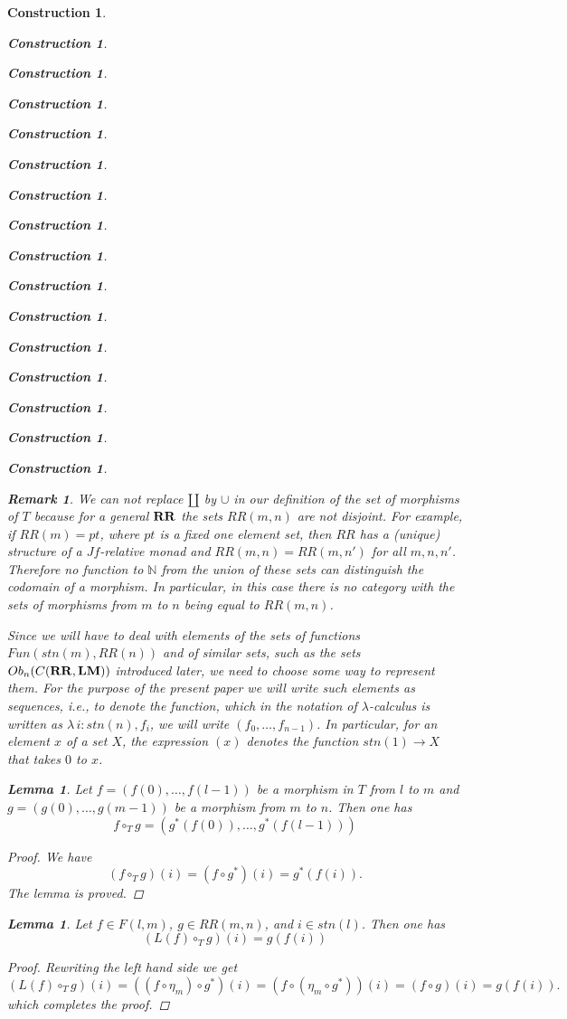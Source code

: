 \documentclass[onecolumn,12pt]{amsart}
\newtheorem{lemma}[proposition]{Lemma}
\newtheorem{remark}[proposition]{Remark}
\numberwithin{proposition}{subsection}
\newtheorem{construction}[proposition]{Construction}
\newcommand{\sr}{\rightarrow}
\newcommand{\nn}{{\mathbb N}}
\newcommand{\nat}{\nn}
\newcommand{\mbind}[1]{{#1^*}}
\newcommand{\hc}{\circ_{T}}
\newcommand{\RR}{{\bf RR}}
\newcommand{\LM}{{\bf LM}}
\begin{document}
\begin{construction}
\begin{construction}
\begin{construction}
\begin{construction}
\begin{construction}
\begin{construction}
\begin{construction}
\begin{construction}
\begin{construction}
\begin{construction}
\begin{construction}
\begin{construction}
\begin{construction}
\begin{construction}
\begin{construction}
\begin{construction}
%
\begin{remark}\rm
\label{2015.11.20.rem4} 
We can not replace $\amalg$ by $\cup$ in our
definition of the set of morphisms of $T$ because for a general $\RR$ the sets
$RR(m,n)$ are not disjoint.  For example, if $RR(m)=pt$, where $pt$ is a fixed
one element set, then $RR$ has a (unique) structure of a $Jf$-relative monad and
$RR(m,n)=RR(m,n')$ for all $m,n,n'$. Therefore no function to $\nat$ from the
union of these sets can distinguish the codomain of a morphism. In particular,
in this case there is no category with the sets of morphisms from $m$ to $n$
being equal to $RR(m,n)$.
\end{remark}
%
Since we will have to deal with elements of the sets of functions
$Fun(stn(m),RR(n))$ and of similar sets, such as the sets $Ob_n(C(\RR,\LM))$
introduced later, we need to choose some way to represent them. For the purpose
of the present paper we will write such elements as sequences, i.e., to denote
the function, which in the notation of $\lambda$-calculus is written as
$\lambda\,i:stn(n), f_i$, we will write $(f_0,\dots,f_{n-1})$. In particular,
for an element $x$ of a set $X$, the expression $(x)$ denotes the function
$stn(1)\sr X$ that takes $0$ to $x$.
%
\begin{lemma}
\label{2016.01.15.l4} 
Let $f=(f(0),\dots,f(l-1))$ be a morphism in $T$ from
$l$ to $m$ and $g=(g(0),\dots,g(m-1))$ be a morphism from $m$ to $n$. Then one has
%
$$f\hc g=(\mbind{g}(f(0)),\dots,\mbind{g}(f(l-1)))$$
%
\end{lemma}
%
\begin{proof}
We have
%
$$(f\hc g)(i)=(f\circ\mbind{g})(i)=\mbind{g}(f(i)).$$
%
The lemma is proved. 
\end{proof}
%
\begin{lemma}
\label{2015.08.30.l1}
Let $f\in F(l,m)$, $g\in RR(m,n)$, and $i\in stn(l)$. Then one has
%
\begin{equation}\label{2015.08.26.eq4}
(L(f)\hc g)(i)=g(f(i))
\end{equation}%
% 
\end{lemma}
%
\begin{proof}
Rewriting the left hand side we get 
%
$$(L(f)\hc g)(i)=((f\circ \eta_{m})\circ \mbind{g})(i)=(f\circ (\eta_{m}\circ \mbind{g}))(i)=(f\circ g)(i)=g(f(i)).$$
%
which completes the proof. 

\end{proof}
\end{construction}
\end{construction}
\end{construction}
\end{construction}
\end{construction}
\end{construction}
\end{construction}
\end{construction}
\end{construction}
\end{construction}
\end{construction}
\end{construction}
\end{construction}
\end{construction}
\end{construction}
\end{construction}
\end{document}
